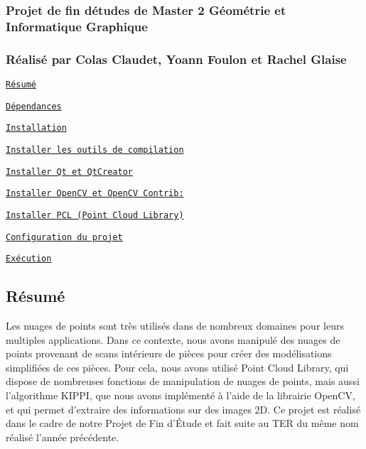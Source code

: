 \subsubsection*{Projet de fin d\textquotesingle{}études de Master 2 Géométrie et Informatique Graphique}

\subsubsection*{Réalisé par Colas Claudet, Yoann Foulon et Rachel Glaise}


\begin{DoxyItemize}
\item \href{#r%c3%a9sum%c3%a9}{\tt Résumé}
\item \href{#d%c3%a9pendances}{\tt Dépendances}
\item \href{#installation}{\tt Installation}
\begin{DoxyItemize}
\item \href{#installer-les-outils-de-compilation}{\tt Installer les outils de compilation}
\item \href{#installer-qt-et-qtcreator}{\tt Installer Qt et Qt\+Creator}
\item \href{#installer-opencv-et-opencv-contrib}{\tt Installer Open\+CV et Open\+CV Contrib\+:}
\item \href{#installer-pcl-point-cloud-library}{\tt Installer P\+CL (Point Cloud Library)}
\item \href{#configuration-du-projet}{\tt Configuration du projet}
\item \href{#exécution}{\tt Exécution}
\end{DoxyItemize}
\end{DoxyItemize}

\subsection*{Résumé}

Les nuages de points sont très utilisés dans de nombreux domaines pour leurs multiples applications. Dans ce contexte, nous avons manipulé des nuages de points provenant de scans intérieurs de pièces pour créer des modélisations simplifiées de ces pièces. Pour cela, nous avons utilisé Point Cloud Library, qui dispose de nombreuses fonctions de manipulation de nuages de points, mais aussi l’algorithme K\+I\+P\+PI, que nous avons implémenté à l’aide de la librairie Open\+CV, et qui permet d’extraire des informations sur des images 2D. Ce projet est réalisé dans le cadre de notre Projet de Fin d’Étude et fait suite au T\+ER du même nom réalisé l’année précédente.

